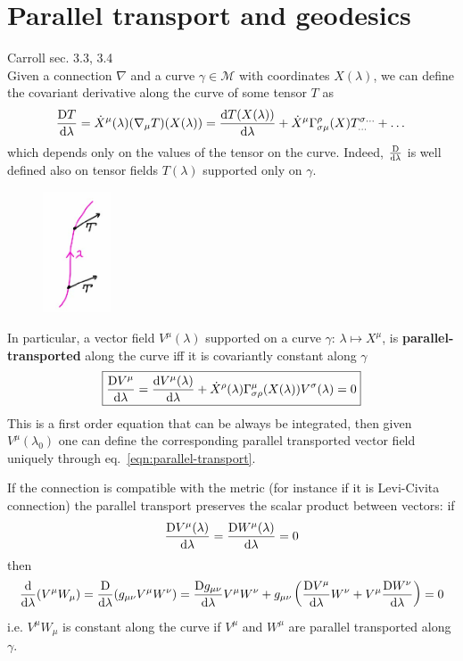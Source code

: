 \documentclass[../main/main.tex]{subfiles}
\begin{document}
\section{Parallel transport and geodesics}
\textsf{Carroll sec. 3.3, 3.4}\\

Given a connection $\nabla$ and a curve $\gamma\in\mathcal M$ with coordinates $X(\lambda)$, we can define the covariant derivative along the curve of some tensor $T$ as
\[\frac{\text{D}T}{\textup{d}\lambda}=\dot X^\mu(\lambda)(\nabla_\mu T)(X(\lambda))=\frac{\textup{d} T(X(\lambda))}{\textup{d} \lambda}+\dot X^\mu{\Gamma}^{\rho}_{\sigma \mu}(X)T^{\sigma\dots}_{\dots}+\dots\]
which depends only on the values of the tensor on the curve. Indeed, $\frac{\text{D}}{\textup{d}\lambda}$ is well defined also on tensor fields $T(\lambda)$ supported only on $\gamma$.
\begin{figure}[H]
\centering
\includegraphics[width=2cm]{../img/parallel-transport.jpg}
\end{figure}
\noindent
In particular, a vector field $V^\mu(\lambda)$ supported on a curve $\gamma:\,\lambda\mapsto X^\mu$, is \textbf{parallel-transported} along the curve iff it is covariantly constant along $\gamma$
\begin{equation}\label{eqn:parallel-transport}\boxed{
\frac{\text{D}V^\mu}{\textup{d}\lambda}=\frac{\textup{d} V^\mu(\lambda)}{\textup{d}  \lambda}+\dot X^\rho(\lambda){\Gamma}^{\mu}_{\sigma \rho}(X(\lambda))V^\sigma(\lambda)=0
}\end{equation}
This is a first order equation that can be always be integrated, then given $V^\mu(\lambda_0)$ one can define the corresponding parallel transported vector field uniquely through eq.~\eqref{eqn:parallel-transport}. 

If the connection is compatible with the metric (for instance if it is Levi-Civita connection) the parallel transport preserves the scalar product between vectors: if
\[\frac{\text{D}V^\mu(\lambda)}{\textup{d}\lambda}=\frac{\text{D}W^\mu(\lambda)}{\textup{d}\lambda}=0\]
then
\[\frac{\textup{d} }{\textup{d} \lambda}(V^\mu W_\mu)=\frac{\text{D}}{\textup{d}\lambda}(g_{\mu\nu}V^\mu W^\nu)=\frac{\text{D}g_{\mu\nu}}{\textup{d}\lambda}V^\mu W^\nu+g_{\mu\nu}\left(\frac{\text{D}V^\mu}{\textup{d}\lambda}W^\nu+V^\mu\frac{\text{D}W^\nu}{\textup{d}\lambda}\right)=0\]
i.e. $V^\mu W_\mu$ is constant along the curve if $V^\mu$ and $W^\mu$ are parallel transported along $\gamma$. 
\end{document}
